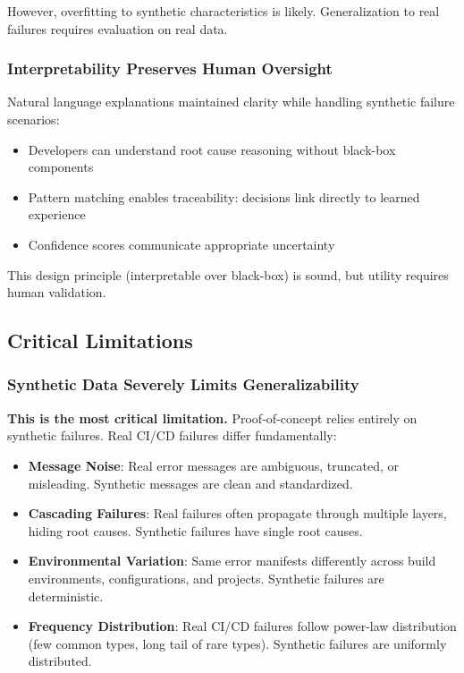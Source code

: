 \documentclass[11pt]{article}
\begin{document}
However, overfitting to synthetic characteristics is likely. Generalization to real failures requires evaluation on real data.

\subsubsection{Interpretability Preserves Human Oversight}

Natural language explanations maintained clarity while handling synthetic failure scenarios:

\begin{itemize}
    \item Developers can understand root cause reasoning without black-box components
    \item Pattern matching enables traceability: decisions link directly to learned experience
    \item Confidence scores communicate appropriate uncertainty
\end{itemize}

This design principle (interpretable over black-box) is sound, but utility requires human validation.

\subsection{Critical Limitations}

\subsubsection{Synthetic Data Severely Limits Generalizability}

\textbf{This is the most critical limitation.} Proof-of-concept relies entirely on synthetic failures. Real CI/CD failures differ fundamentally:

\begin{itemize}
    \item \textbf{Message Noise}: Real error messages are ambiguous, truncated, or misleading. Synthetic messages are clean and standardized.
    \item \textbf{Cascading Failures}: Real failures often propagate through multiple layers, hiding root causes. Synthetic failures have single root causes.
    \item \textbf{Environmental Variation}: Same error manifests differently across build environments, configurations, and projects. Synthetic failures are deterministic.
    \item \textbf{Frequency Distribution}: Real CI/CD failures follow power-law distribution (few common types, long tail of rare types). Synthetic failures are uniformly distributed.
\end{itemize}
\end{document}
